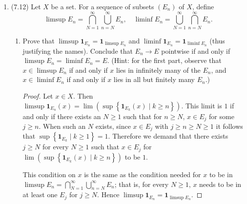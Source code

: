 \documentclass[11pt]{article}
\newcommand{\cbr}[1]{\left\{#1\right\}}
\begin{document}
\begin{enumerate}
\begin{enumerate}
\begin{proof}
            Let $A\in\mathscr{A}$ so that $A = \bigcup_{k\in C}A_k$ for some $C\subseteq \mathbb{Z}_+$. Then \begin{align*}
                \mu(A) &= \mu\left(\bigcup_{k\in C}A_k\right)\\
                &= \sum_{k\in C}\mu(A_k) & \text{(the $A_k$ are disjoint)}\\
                &= \sum_{k\in C}\mu(A_k)\delta_k(A) & \text{(for $k\in C$, $\delta_k(A) = 1$)}\\
                &= \sum_{k\in C}\mu(A_k)\delta_k(A) + \sum_{k\in \mathbb{Z}_+\setminus C}\mu(A_k)\delta_k(A) & \text{(for $k\in \mathbb{Z}_+\setminus C$, $\delta_k(A) = 0$)}\\
                &= \sum_{n=1}^\infty \mu(A_n)\delta_n(A),
            \end{align*} and since $\mu$ maps into $[0,+\infty]$, we have our desired sequence $(c_n = \mu(A_n))$.
        \end{proof}
    \end{enumerate}
    \item (7.12) Let $X$ be a set. For a sequence of subsets $(E_n)$ of $X$, define \[\limsup E_n = \bigcap_{N=1}^\infty \bigcup_{n=N}^\infty E_n, \quad \liminf E_n = \bigcup_{N=1}^\infty\bigcap_{n=N}^\infty E_n.\] \begin{enumerate}
        \item Prove that $\limsup \mathbf{1}_{E_n} = \mathbf{1}_{\limsup E_n}$ and $\liminf \mathbf{1}_{E_n} = \mathbf{1}_{\liminf E_n}$ (thus justifying the names). Conclude that $E_n\to E$ pointwise if and only if $\limsup E_n = \liminf E_n = E$. (Hint: for the first part, observe that $x\in \limsup E_n$ if and only if $x$ lies in infinitely
        many of the $E_n$, and $x\in \liminf E_n$ if and only if $x$ lies in all but finitely many $E_n$.) \begin{proof}
            Let $x\in X$. Then $\limsup \mathbf{1}_{E_n}(x)= \lim (\sup\cbr{\mathbf{1}_{E_k}(x)\mid k\geq n})$. This limit is $1$ if and only if there exists an $N\geq 1$ such that for $n\geq N$, $x\in E_j$ for some $j\geq n$. When such an $N$ exists, since $x\in E_j$ with $j\geq n\geq N\geq 1$ it follows that $\sup\cbr{\mathbf{1}_{E_k}\mid k\geq 1} = 1$. Therefore we demand that there exists $j\geq N$ for every $N\geq 1$ such that $x\in E_j$ for $\lim (\sup\cbr{\mathbf{1}_{E_k}(x)\mid k\geq n})$ to be $1$.
            
            This condition on $x$ is the same as the condition needed for $x$ to be in $\limsup E_n = \bigcap_{N=1}^\infty \bigcup_{n=N}^\infty E_n$; that is, for every $N\geq 1$, $x$ needs to be in at least one $E_j$ for $j\geq N$. Hence $\limsup \mathbf{1}_{E_n} = \mathbf{1}_{\limsup E_n}$.


\end{proof}
\end{enumerate}
\end{enumerate}
\end{document}
